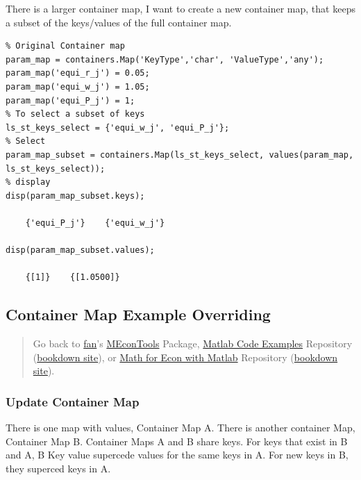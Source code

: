 \documentclass[
]{book}
\begin{document}
There is a larger container map, I want to create a new container map,
that keeps a subset of the keys/values of the full container map.

\begin{verbatim}
% Original Container map
param_map = containers.Map('KeyType','char', 'ValueType','any');
param_map('equi_r_j') = 0.05;
param_map('equi_w_j') = 1.05;
param_map('equi_P_j') = 1;
% To select a subset of keys
ls_st_keys_select = {'equi_w_j', 'equi_P_j'};
% Select
param_map_subset = containers.Map(ls_st_keys_select, values(param_map, ls_st_keys_select));
% display
disp(param_map_subset.keys);

    {'equi_P_j'}    {'equi_w_j'}

disp(param_map_subset.values);

    {[1]}    {[1.0500]}
\end{verbatim}

\hypertarget{container-map-example-overriding}{%
\subsection{Container Map Example Overriding}\label{container-map-example-overriding}}

\begin{quote}
Go back to \href{http://fanwangecon.github.io/}{fan}'s \href{https://fanwangecon.github.io/MEconTools/}{MEconTools} Package, \href{https://fanwangecon.github.io/M4Econ/}{Matlab Code Examples} Repository (\href{https://fanwangecon.github.io/M4Econ/bookdown}{bookdown site}), or \href{https://fanwangecon.github.io/Math4Econ/}{Math for Econ with Matlab} Repository (\href{https://fanwangecon.github.io/Math4Econ/bookdown}{bookdown site}).
\end{quote}

\hypertarget{update-container-map}{%
\subsubsection{Update Container Map}\label{update-container-map}}

There is one map with values, Container Map A. There is another
container Map, Container Map B. Container Maps A and B share keys. For
keys that exist in B and A, B Key value supercede values for the same
keys in A. For new keys in B, they superced keys in A.
\end{document}
